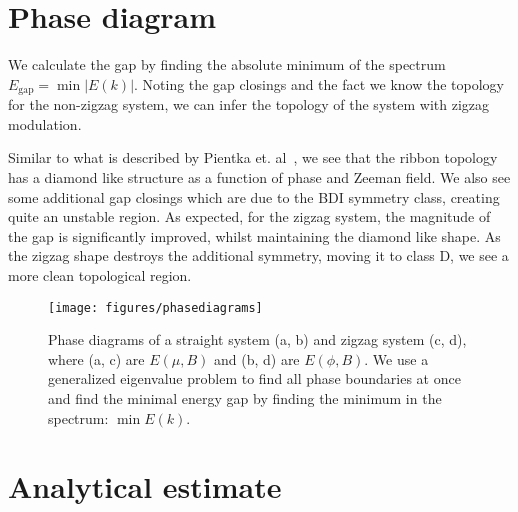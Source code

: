	\section{Phase diagram}
		We calculate the gap by finding the absolute minimum of the spectrum $E_\textrm{gap}=\min{|E(k)|}$.
		Noting the gap closings and the fact we know the topology for the non-zigzag system, we can infer the topology of the system with zigzag modulation. %

		Similar to what is described by Pientka et. al~\cite{pientka2017topological}, we see that the ribbon topology has a diamond like structure as a function of phase and Zeeman field.
		We also see some additional gap closings which are due to the BDI symmetry class, creating quite an unstable region.
		As expected, for the zigzag system, the magnitude of the gap is significantly improved, whilst maintaining the diamond like shape.
		As the zigzag shape destroys the additional symmetry, moving it to class D, we see a more clean topological region.

		\begin{figure}[!htb]
		\texttt{[image: figures/phasediagrams]}
		\caption{Phase diagrams of a straight system (a, b) and zigzag system (c, d), where (a, c) are $E(\mu, B)$ and (b, d) are $E(\phi, B)$.
		We use a generalized eigenvalue problem to find all phase boundaries at once and find the minimal energy gap by finding the minimum in the spectrum: $\min{E(k)}$.
		\label{fig:phasediagrams}}
		\end{figure}

	\section{Analytical estimate}
		